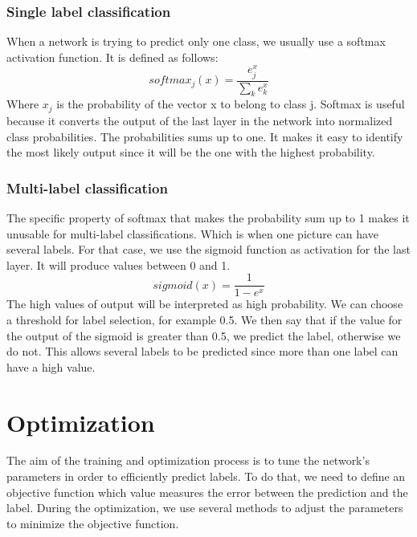 \subsubsection{Single label classification}
When a network is trying to predict only one class, we usually use a softmax activation function. It is defined as follows: \[softmax_j(x) = \frac{e^x_{j}}{\sum\nolimits_{k} e^x_{k}} \] Where \(x_j\) is the probability of the vector x to belong to class j. Softmax is useful because it converts the output of the last layer in the network into normalized class probabilities. The probabilities sums up to one. It makes it easy to identify the most likely output since it will be the one with the highest probability. 
\subsubsection{Multi-label classification}
The specific property of softmax that makes the probability sum up to 1 makes it unusable for multi-label classifications. Which is when one picture can have several labels. For that case, we use the sigmoid function as activation for the last layer. It will produce values between 0 and 1.
\[sigmoid(x) = \frac{1}{1 - e^x} \]
The high values of output will be interpreted as high probability. We can choose a threshold for label selection, for example 0.5. We then say that if the value for the output of the sigmoid is greater than 0.5, we predict the label, otherwise we do not. This allows several labels to be predicted since more than one label can have a high value. 

\section{Optimization}
The aim of the training and optimization process is to tune the network's parameters in order to efficiently predict labels. To do that, we need to define an objective function which value measures the error between the prediction and the label. During the optimization, we use several methods to adjust the parameters to minimize the objective function.

